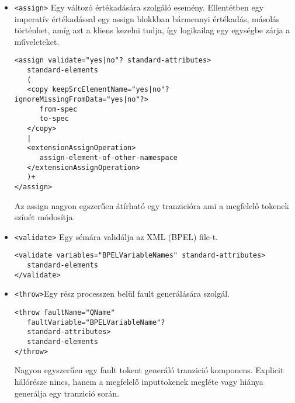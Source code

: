 \documentclass[12pt,a4paper]{book}
\begin{document}
\begin{itemize}
\item \texttt{<assign>} Egy változó értékadására szolgáló esemény. Ellentétben egy imperatív értékadással egy assign blokkban bármennyi értékadás, másolás történhet, amíg azt a kliens kezelni tudja, így logikailag egy egységbe zárja a műveleteket.  
\begin{verbatim}
<assign validate="yes|no"? standard-attributes>
   standard-elements
   (
   <copy keepSrcElementName="yes|no"? ignoreMissingFromData="yes|no"?>
      from-spec
      to-spec
   </copy>
   |
   <extensionAssignOperation>
      assign-element-of-other-namespace
   </extensionAssignOperation>
   )+
</assign>
\end{verbatim}
Az assign nagyon egszerűen átírható egy tranzicióra ami a megfelelő tokenek színét módosítja. 
\item \texttt{<validate>} Egy sémára validálja az XML (BPEL) file-t. 
\begin{verbatim}
<validate variables="BPELVariableNames" standard-attributes>
   standard-elements
</validate>
\end{verbatim}
\item \texttt{<throw>}Egy rész processzen belül fault generálására szolgál. 
\begin{verbatim}
<throw faultName="QName"
   faultVariable="BPELVariableName"?
   standard-attributes>
   standard-elements
</throw>
\end{verbatim}
Nagyon egyszerűen egy fault tokent generáló tranzició komponens. Explicit hálórésze nincs, hanem a megfelelő inputtokenek megléte vagy hiánya generálja egy tranzició során. 


\end{itemize}
\end{document}
